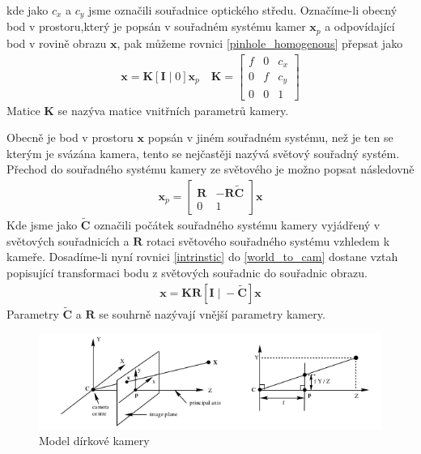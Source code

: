 \documentclass[twoside]{ctuthesis}
\newcommand{\tl}[1]{$\mathbf{#1}$}
\begin{document}
kde jako $c_x$ a $c_y$ jsme označili souřadnice optického středu. Označíme-li obecný bod v prostoru,který je popsán v souřadném systému kamer \tl{x}$_p$ a odpovídající bod v rovině obrazu \tl{x}, pak můžeme rovnici \ref{pinhole_homogenous} přepsat jako
\begin{align}
    \mathbf{x} = \mathbf{K}[\mathbf{I}\; |\; 0 ]\mathbf{x}_p \quad \mathbf{K} = \begin{bmatrix} f & 0 & c_x  \\ 0 & f & c_y  \\ 0 & 0 & 1  \end{bmatrix}
    \label{intrinstic}
\end{align}
Matice \tl{K} se nazýva matice vnitřních parametrů kamery.

Obecně je bod v prostoru $\mathbf{x}$ popsán v jiném souřadném systému, než je ten se kterým je svázána kamera, tento se nejčastěji nazývá světový souřadný systém. Přechod do souřadného systému kamery ze světového je možno popsat následovně 
\begin{align} 
    \mathbf{x}_p = \begin{bmatrix} \mathbf{R} & -\mathbf{R\tilde C} \\ 0 & 1 \end{bmatrix}
    \mathbf{x}
    \label{world_to_cam}
\end{align}
Kde jsme jako $\tilde{\mathbf{C}}$ označili počátek souřadného systému kamery vyjádřený v světových souřadnicích a \tl{R} rotaci světového souřadného systému vzhledem k kameře. Dosadíme-li nyní rovnici \ref{intrinstic} do \ref{world_to_cam} dostane vztah popisující transformaci bodu z světových souřadnic do souřadnic obrazu.
\begin{align}
    \mathbf{x} = \mathbf{KR}[\mathbf{I} \; | \; - \mathbf{\tilde C} ]\mathbf{x}
    \label{world_to_img}
\end{align}
Parametry $\mathbf{\tilde C}$ a \tl{R} se souhrně nazývají vnější parametry kamery. 
\begin{figure}
    \centering
    \includegraphics[width = 0.8\linewidth]{pictures/dirkovymodel_nakres.png}
    \caption{Model dírkové kamery}
    \label{pinhole}
\end{figure}
\end{document}
